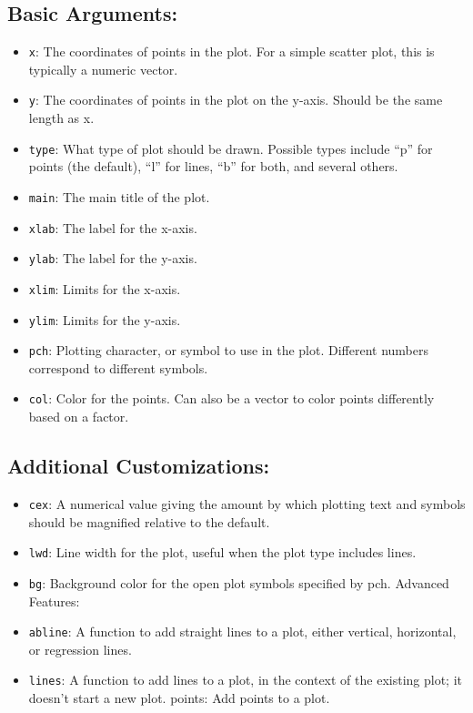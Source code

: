 \documentclass[
]{book}
\providecommand{\tightlist}{%
  \setlength{\itemsep}{0pt}\setlength{\parskip}{0pt}}
\begin{document}
\subsection*{Basic Arguments:}\label{basic-arguments}

\begin{itemize}
\tightlist
\item
  \texttt{x}: The coordinates of points in the plot. For a simple scatter plot, this is typically a numeric vector.
\item
  \texttt{y}: The coordinates of points in the plot on the y-axis. Should be the same length as x.
\item
  \texttt{type}: What type of plot should be drawn. Possible types include ``p'' for points (the default), ``l'' for lines, ``b'' for both, and several others.
\item
  \texttt{main}: The main title of the plot.
\item
  \texttt{xlab}: The label for the x-axis.
\item
  \texttt{ylab}: The label for the y-axis.
\item
  \texttt{xlim}: Limits for the x-axis.
\item
  \texttt{ylim}: Limits for the y-axis.
\item
  \texttt{pch}: Plotting character, or symbol to use in the plot. Different numbers correspond to different symbols.
\item
  \texttt{col}: Color for the points. Can also be a vector to color points differently based on a factor.
\end{itemize}

\subsection*{Additional Customizations:}\label{additional-customizations}

\begin{itemize}
\tightlist
\item
  \texttt{cex}: A numerical value giving the amount by which plotting text and symbols should be magnified relative to the default.
\item
  \texttt{lwd}: Line width for the plot, useful when the plot type includes lines.
\item
  \texttt{bg}: Background color for the open plot symbols specified by pch.
  Advanced Features:
\item
  \texttt{abline}: A function to add straight lines to a plot, either vertical, horizontal, or regression lines.
\item
  \texttt{lines}: A function to add lines to a plot, in the context of the existing plot; it doesn't start a new plot.
  points: Add points to a plot.
\end{itemize}
\end{document}
